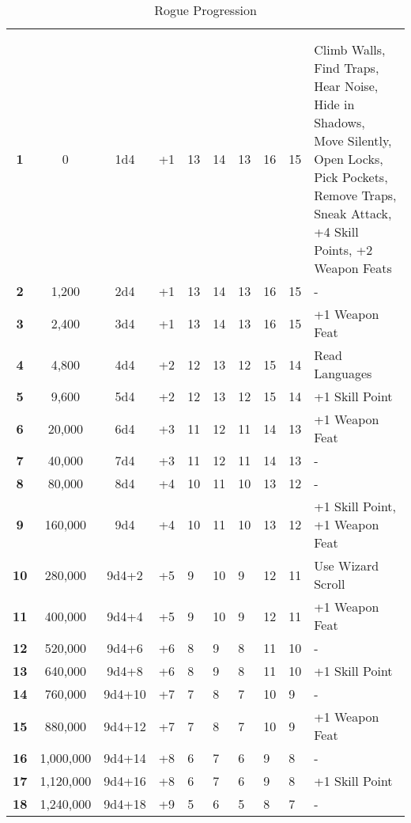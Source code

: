 \begin {table}[H]
  \caption{Rogue Progression}
	\begin{tabularx}{\columnwidth}{>{\bfseries}cccM{.31in}M{.51in}M{.25in}M{.43in}M{.32in}M{.45in}Y}
    \thead{}&\thead{}&\thead{}&\thead{}&\thead{}&\setcounter{rownum}{0}\\
     &  &  &  &  &  &  &  &  & \\
		1 & 0 & 1d4 & +1 & 13 & 14 & 13 & 16 & 15 & Climb Walls, Find Traps, Hear Noise, Hide in Shadows, Move Silently, Open Locks, Pick Pockets, Remove Traps, Sneak Attack, +4 Skill Points, +2 Weapon Feats\\
		2 & 1,200 & 2d4 & +1 & 13 & 14 & 13 & 16 & 15 & -\\
		3 & 2,400 & 3d4 & +1 & 13 & 14 & 13 & 16 & 15 & +1 Weapon Feat\\
		4 & 4,800 & 4d4 & +2 & 12 & 13 & 12 & 15 & 14 & Read Languages\\
		5 & 9,600 & 5d4 & +2 & 12 & 13 & 12 & 15 & 14 & +1 Skill Point\\
		6 & 20,000 & 6d4 & +3 & 11 & 12 & 11 & 14 & 13 & +1 Weapon Feat\\
		7 & 40,000 & 7d4 & +3 & 11 & 12 & 11 & 14 & 13 & -\\
		8 & 80,000 & 8d4 & +4 & 10 & 11 & 10 & 13 & 12 & -\\
		9 & 160,000 & 9d4 & +4 & 10 & 11 & 10 & 13 & 12 & +1 Skill Point, +1 Weapon Feat\\
		10 & 280,000 & 9d4+2 & +5 & 9 & 10 & 9 & 12 & 11 & Use Wizard Scroll\\
		11 & 400,000 & 9d4+4 & +5 & 9 & 10 & 9 & 12 & 11 & +1 Weapon Feat\\
		12 & 520,000 & 9d4+6 & +6 & 8 & 9 & 8 & 11 & 10 & -\\
		13 & 640,000 & 9d4+8 & +6 & 8 & 9 & 8 & 11 & 10 & +1 Skill Point\\
		14 & 760,000 & 9d4+10 & +7 & 7 & 8 & 7 & 10 & 9 & -\\
		15 & 880,000 & 9d4+12 & +7 & 7 & 8 & 7 & 10 & 9 & +1 Weapon Feat\\
		16 & 1,000,000 & 9d4+14 & +8 & 6 & 7 & 6 & 9 & 8 & -\\
		17 & 1,120,000 & 9d4+16 & +8 & 6 & 7 & 6 & 9 & 8 & +1 Skill Point\\
		18 & 1,240,000 & 9d4+18 & +9 & 5 & 6 & 5 & 8 & 7 & -\\

\end{tabularx}
\end{table}
